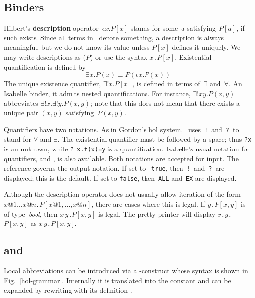 \subsection{Binders}
Hilbert's {\bf description} operator~$\epsilon x.P[x]$ stands for some~$a$
satisfying~$P[a]$, if such exists.  Since all terms in \HOL\ denote
something, a description is always meaningful, but we do not know its value
unless $P[x]$ defines it uniquely.  We may write descriptions as
($P$) or use the syntax
\hbox{\tt \at $x$.$P[x]$}.  Existential quantification is defined
by
\[ \exists x.P(x) \equiv P(\epsilon x.P(x)) \]
The unique existence quantifier, $\exists!x.P[x]$, is defined in terms
of~$\exists$ and~$\forall$.  An Isabelle binder, it admits nested
quantifications.  For instance, $\exists!x y.P(x,y)$ abbreviates
$\exists!x. \exists!y.P(x,y)$; note that this does not mean that there
exists a unique pair $(x,y)$ satisfying~$P(x,y)$.

Quantifiers have two notations.  As in Gordon's {\sc hol} system, \HOL\
uses~{\tt!}\ and~{\tt?}\ to stand for $\forall$ and $\exists$.  The
existential quantifier must be followed by a space; thus {\tt?x} is an
unknown, while \verb'? x.f(x)=y' is a quantification.  Isabelle's usual
notation for quantifiers, \ttindex{ALL} and \ttindex{EX}, is also
available.  Both notations are accepted for input.  The {\ML} reference
\ttindexbold{HOL_quantifiers} governs the output notation.  If set to {\tt
true}, then~{\tt!}\ and~{\tt?}\ are displayed; this is the default.  If set
to {\tt false}, then~{\tt ALL} and~{\tt EX} are displayed.

\begin{warn}
Although the description operator does not usually allow iteration of the
form \hbox{\tt \at $x@1 \dots x@n$.$P[x@1,\dots,x@n]$}, there are cases where
this is legal.  If \hbox{\tt \at $y$.$P[x,y]$} is of type~{\it bool},
then \hbox{\tt \at $x\,y$.$P[x,y]$} is legal.  The pretty printer will
display \hbox{\tt \at $x$.\at $y$.$P[x,y]$} as
\hbox{\tt \at $x\,y$.$P[x,y]$}.
\end{warn}

\subsection{ and }
Local abbreviations can be introduced via a -construct whose
syntax is shown in Fig.~\ref{hol-grammar}. Internally it is translated into
the constant \ttindex{Let} and can be expanded by rewriting with its
definition \ttindex{Let_def}.

